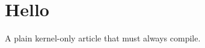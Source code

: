 \documentclass{article}
\begin{document}
\section{Hello}
A plain kernel-only article that must always compile.
\end{document}
